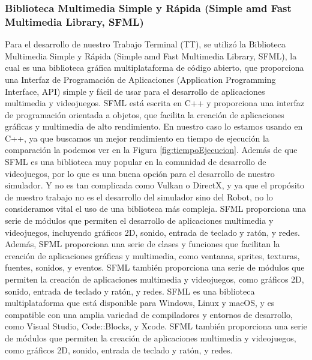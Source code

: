 \subsubsection{Biblioteca Multimedia Simple y R\'apida (Simple amd Fast Multimedia Library, SFML)}
    Para el desarrollo de nuestro Trabajo Terminal (TT), se utiliz\'o la Biblioteca Multimedia Simple y R\'apida (Simple amd Fast Multimedia Library, SFML), 
        la cual es una biblioteca gr\'afica multiplataforma de c\'odigo abierto, que proporciona una Interfaz de Programaci\'on de Aplicaciones (Application Programming Interface, API) simple y f\'acil de usar 
        para el desarrollo de aplicaciones multimedia y videojuegos. SFML est\'a escrita en C++ y proporciona una interfaz de 
        programaci\'on orientada a objetos, que facilita la creaci\'on de aplicaciones gr\'aficas y multimedia de alto rendimiento.
    \vskip 0.5cm
    En nuestro caso lo estamos usando en C++, ya que buscamos un mejor rendimiento en tiempo de ejecuci\'on la comparaci\'on la podemos ver
        en la Figura \ref{fig:tiempoEjecucion}. Adem\'as de que SFML es una biblioteca muy popular en la comunidad de desarrollo de videojuegos, por lo que es una buena opci\'on 
        para el desarrollo de nuestro simulador. Y no es tan complicada como Vulkan o DirectX, y ya que el prop\'osito de nuestro trabajo 
        no es el desarrollo del simulador sino del Robot, no lo consideramos vital el uso de una biblioteca m\'as compleja.
    \vskip 0.5cm
    SFML proporciona una serie de m\'odulos que permiten el desarrollo de aplicaciones multimedia y videojuegos, 
        incluyendo gr\'aficos 2D, sonido, entrada de teclado y rat\'on, y redes. Adem\'as, SFML proporciona una serie de 
        clases y funciones que facilitan la creaci\'on de aplicaciones gr\'aficas y multimedia, como ventanas, sprites, 
        texturas, fuentes, sonidos, y eventos. SFML tambi\'en proporciona una serie de m\'odulos que permiten la creaci\'on 
        de aplicaciones multimedia y videojuegos, como gr\'aficos 2D, sonido, entrada de teclado y rat\'on, y redes.
    \vskip 0.5cm
    SFML es una biblioteca multiplataforma que est\'a disponible para Windows, Linux y macOS, y es compatible con una 
        amplia variedad de compiladores y entornos de desarrollo, como Visual Studio, Code::Blocks, y Xcode. SFML tambi\'en 
        proporciona una serie de m\'odulos que permiten la creaci\'on de aplicaciones multimedia y videojuegos, como gr\'aficos 
        2D, sonido, entrada de teclado y rat\'on, y redes.
    \vskip 0.5cm
